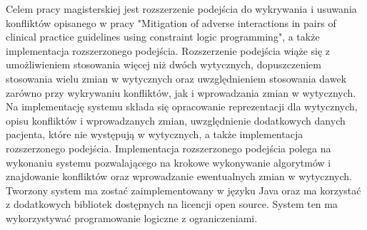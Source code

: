 \begin{spacing}{1.5}

Celem pracy magisterskiej jest rozszerzenie podejścia do wykrywania i usuwania konfliktów opisanego w pracy "Mitigation of adverse interactions in pairs of clinical practice guidelines using constraint logic programming"\cite{SzWilk2}, a także implementacja rozszerzonego podejścia. Rozszerzenie podejścia wiąże się z umożliwieniem stosowania więcej niż dwóch wytycznych, dopuszczeniem stosowania wielu zmian w wytycznych oraz uwzględnieniem stosowania dawek zarówno przy wykrywaniu konfliktów, jak i wprowadzania zmian w wytycznych. Na implementację systemu składa się opracowanie reprezentacji dla wytycznych, opisu konfliktów i wprowadzanych zmian, uwzględnienie dodatkowych danych pacjenta, które nie występują w wytycznych, a także implementacja rozszerzonego podejścia. Implementacja rozszerzonego podejścia polega na wykonaniu systemu pozwalającego na krokowe wykonywanie algorytmów i znajdowanie konfliktów oraz wprowadzanie ewentualnych zmian w wytycznych. Tworzony system ma zostać zaimplementowany w języku Java oraz ma korzystać z dodatkowych bibliotek dostępnych na licencji open source. System ten ma wykorzystywać programowanie logiczne z ograniczeniami.



\end{spacing}
